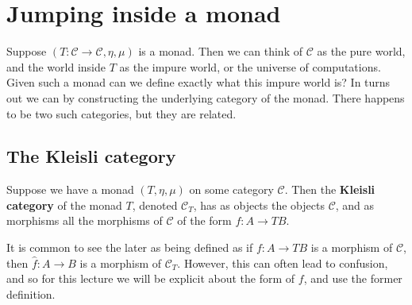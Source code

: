 \documentclass{article}
\let\mto\to
\let\to\relax
\newcommand{\to}{\rightarrow}
\newcommand{\cat}[1]{\mathcal{#1}}
\begin{document}
\section{Jumping inside a monad}
\label{sec:jumping_inside_a_monad}

Suppose $(T : \cat{C} \mto \cat{C},\eta,\mu)$ is a monad.  Then we can
think of $\cat{C}$ as the pure world, and the world inside $T$ as the
impure world, or the universe of computations.  Given such a monad can
we define exactly what this impure world is?  In turns out we can by
constructing the underlying category of the monad.  There happens to
be two such categories, but they are related.

\subsection{The Kleisli category}
\label{subsec:the_kleisli_category}
Suppose we have a monad $(T,\eta,\mu)$ on some category $\cat{C}$.
Then the \textbf{Kleisli category} of the monad $T$, denoted
$\cat{C}_T$, has as objects the objects $\cat{C}$, and as morphisms
all the morphisms of $\cat{C}$ of the form $f : A \mto TB$.

It is common to see the later as being defined as if $f : A \mto TB$
is a morphism of $\cat{C}$, then $\hat{f} : A \mto B$ is a morphism of
$\cat{C}_T$.  However, this can often lead to confusion, and so for
this lecture we will be explicit about the form of $f$, and use the
former definition.
\end{document}
